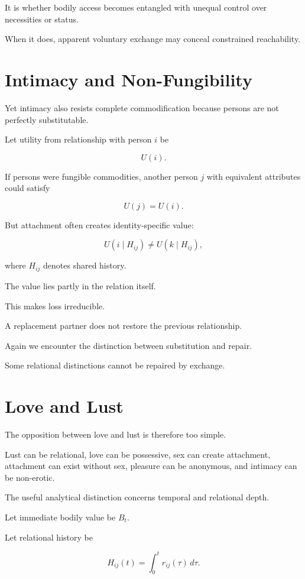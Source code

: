 \documentclass[11pt,oneside]{book}
\theoremstyle{definition}
\theoremstyle{remark}
\begin{document}
It is whether bodily access becomes entangled with unequal control over necessities or status.

When it does, apparent voluntary exchange may conceal constrained reachability.

\section{Intimacy and Non-Fungibility}

Yet intimacy also resists complete commodification because persons are not perfectly substitutable.

Let utility from relationship with person \(i\) be

\[
U(i).
\]

If persons were fungible commodities, another person \(j\) with equivalent attributes could satisfy

\[
U(j)=U(i).
\]

But attachment often creates identity-specific value:

\[
U(i\mid H_{ij})
\neq
U(k\mid H_{ij}),
\]

where \(H_{ij}\) denotes shared history.

The value lies partly in the relation itself.

This makes loss irreducible.

A replacement partner does not restore the previous relationship.

Again we encounter the distinction between substitution and repair.

Some relational distinctions cannot be repaired by exchange.

\section{Love and Lust}

The opposition between love and lust is therefore too simple.

Lust can be relational, love can be possessive, sex can create attachment, attachment can exist without sex, pleasure can be anonymous, and intimacy can be non-erotic.

The useful analytical distinction concerns temporal and relational depth.

Let immediate bodily value be \(B_t\).

Let relational history be

\[
H_{ij}(t)
=
\int_0^t
r_{ij}(\tau)\,d\tau.
\]
\end{document}
